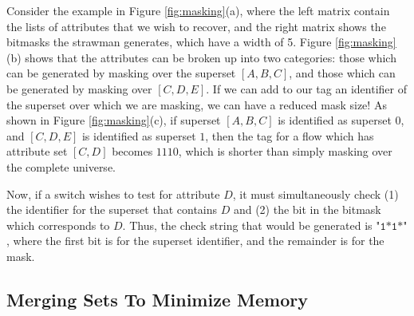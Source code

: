 Consider the example in Figure \ref{fig:masking}(a), where the left matrix
contain the lists of attributes that we wish to recover, and the right matrix
shows the bitmasks the strawman generates, which have a width of 5. Figure
\ref{fig:masking}(b) shows that the attributes can be broken up into two
categories: those which can be generated by masking over the superset $[A,B,C]$,
and those which can be generated by masking over $[C,D,E]$. If we can add to our
tag an identifier of the superset over which we are masking, we can have a
reduced mask size! As shown in Figure \ref{fig:masking}(c), if superset
$[A,B,C]$ is identified as superset $0$, and $[C,D,E]$ is identified as superset
$1$, then the tag for a flow which has attribute set $[C,D]$ becomes
$1110$, which is shorter than simply masking over the complete universe.

Now, if a switch wishes to test for attribute $D$, it must simultaneously check
(1) the identifier for the superset that contains $D$ and (2) the bit in the
bitmask which corresponds to $D$. Thus, the check string that would be generated is $\texttt{"1*1*"}$, where the first bit is for
the superset identifier, and the remainder is for the mask.



\subsection{Merging Sets To Minimize Memory}
\label{ssec:merge}




